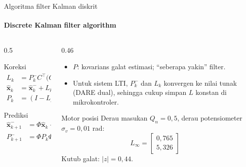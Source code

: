 \documentclass[aspectratio=169,10pt]{beamer}
\begin{document}
\begin{frame}{Algoritma filter Kalman diskrit}
	\framesubtitle{Discrete Kalman filter algorithm}
	\begin{columns}[T]
		\begin{column}{0.5\textwidth}
			\begin{block}{Koreksi }
				\small
				\begin{align*}
					L_k &= P_k^-C^\top\big(CP_k^-C^\top + R_n\big)^{-1}\\
					\hat{\mathbf{x}}_k &= \hat{\mathbf{x}}_k^- + L_k\big(y[k] - C\hat{\mathbf{x}}_k^-\big)\\
					P_k &= (I - L_kC)\,P_k^-
				\end{align*}
			\end{block}
			\begin{block}{Prediksi }
				\small
				\begin{align*}
					\hat{\mathbf{x}}_{k+1}^- &= \Phi\hat{\mathbf{x}}_k + \Gamma u[k]\\
					P_{k+1}^- &= \Phi P_k\Phi^\top + \Gamma_wQ_n\Gamma_w^\top
				\end{align*}
			\end{block}
		\end{column}
		\begin{column}{0.46\textwidth}
			\small
			\begin{itemize}
				\item $P$: kovarians galat estimasi; ``seberapa yakin'' filter.
				\item Untuk sistem LTI, $P_k^-$ dan $L_k$ konvergen ke nilai tunak (DARE dual), sehingga cukup simpan $L$ konstan di mikrokontroler.
			\end{itemize}
			\begin{exampleblock}{Motor posisi}
				\small
				Derau masukan $Q_n = 0{,}5$, derau potensiometer $\sigma_v = 0{,}01$ rad:
				\[
					L_\infty = \begin{bmatrix}0{,}765\\ 5{,}326\end{bmatrix}
				\]
				Kutub galat: $|z| = 0{,}44$.
			\end{exampleblock}
		\end{column}
	\end{columns}
\end{frame}
\end{document}
